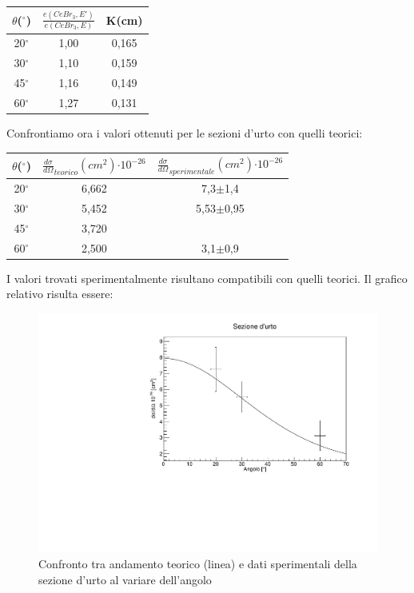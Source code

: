 \documentclass[italian,11pt]{report}
\begin{document}
\vspace{0,5cm}
\begin{center}
\centering
    \begin{tabular}{ccc}
    \hline
     $\theta$($^\circ$)&  $\frac{e(CeBr_{3},E')}{e(CeBr_{3},E)}$& K(cm)\\
    \hline\hline
    20$^\circ$& 1,00 & 0,165\\
    30$^\circ$& 1,10 & 0,159\\
    45$^\circ$& 1,16& 0,149\\
    60$^\circ$& 1,27& 0,131\\
    \hline
    \end{tabular}
\end{center}
\vspace{0,5cm}
Confrontiamo ora i valori ottenuti per le sezioni d'urto con quelli teorici:   
\vspace{0,5cm}
\begin{center}
\centering
    \begin{tabular}{ccc}
    \hline
    $\theta$($^\circ$)&  ${\frac{d\sigma}{d\Omega}}_{teorico}(cm^{2})$$\cdot$$10^{-26}$& ${\frac{d\sigma}{d\Omega}}_{sperimentale}(cm^{2})$$\cdot$$10^{-26}$\\
    \hline\hline
    20$^\circ$ & 6,662&  7,3$\pm$1,4\\
    30$^\circ$& 5,452&  5,53$\pm$0,95\\
    45$^\circ$& 3,720& \\
    60$^\circ$& 2,500&  3,1$\pm$0,9\\
    \hline
    \end{tabular}
\end{center}
\vspace{0,5cm}
I valori trovati sperimentalmente risultano compatibili con quelli teorici. Il grafico relativo risulta essere:
\begin{figure}[!htp]
\centering
\includegraphics[width=12cm]{sezioned'urto.pdf}
\caption{Confronto tra andamento teorico (linea) e dati sperimentali della sezione d'urto al variare dell'angolo}
\end{figure}
\end{document}
